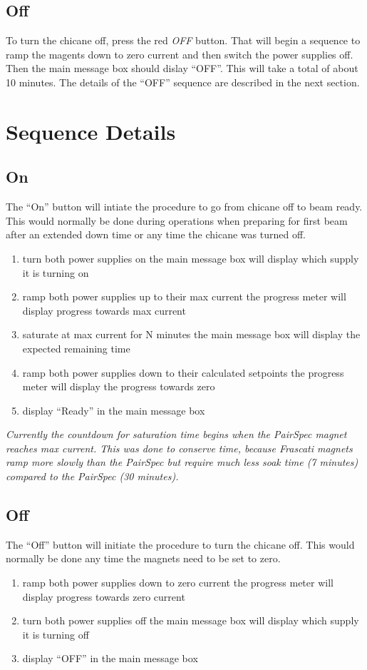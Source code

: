 \documentclass[amsmath,amssymb,notitlepage,12pt]{revtex4-1}
\begin{document}
\subsection{Off}
To turn the chicane off, press the red {\em OFF} button.  That will begin a sequence to ramp the magents down to zero current and then switch the power supplies off.  Then the main message box should dislay ``OFF''.  This will take a total of about 10 minutes.  The details of the ``OFF'' sequence are described in the next section.

\section{Sequence Details}
\subsection{On}
The ``On'' button will intiate the procedure to go from chicane off to beam ready.  This would normally be done during operations when preparing for first beam after an extended down time or any time the chicane was turned off.
\begin{enumerate}
    \item turn both power supplies on
    \subitem the main message box will display which supply it is turning on
    \item ramp both power supplies up to their max current
    \subitem the progress meter will display progress towards max current
    \item saturate at max current for N minutes
    \subitem the main message box will display the expected remaining time
    \item ramp both power supplies down to their calculated setpoints
    \subitem the progress meter will display the progress towards zero
    \item display ``Ready'' in the main message box
\end{enumerate}
{\em Currently the countdown for saturation time begins when the PairSpec magnet reaches max current.  This was done to conserve time, because Frascati magnets ramp more slowly than the PairSpec but require much less soak time (7 minutes) compared to the PairSpec (30 minutes).}
\subsection{Off}
The ``Off'' button will initiate the procedure to turn the chicane off.  This would normally be done any time the magnets need to be set to zero.
\begin{enumerate}
    \item ramp both power supplies down to zero current
    \subitem the progress meter will display progress towards zero current
    \item turn both power supplies off
    \subitem the main message box will display which supply it is turning off
    \item display ``OFF'' in the main message box
\end{enumerate}
\end{document}
